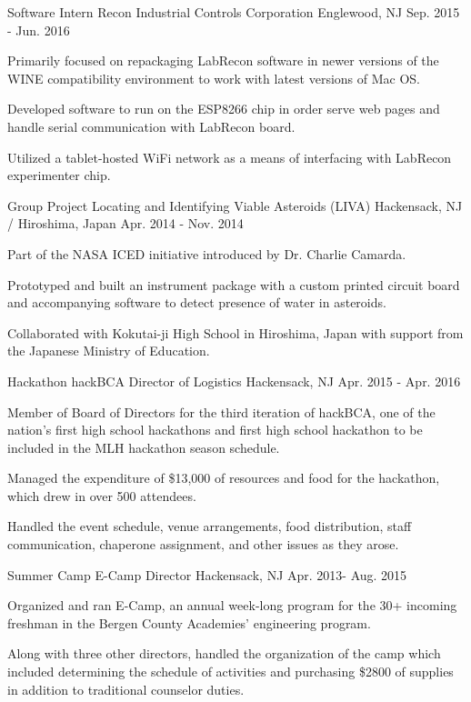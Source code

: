 \begin{cventries}
  \cventry
    {Software Intern}
    {Recon Industrial Controls Corporation}
    {Englewood, NJ}
    {Sep. 2015 - Jun. 2016}
    {
      \begin{cvitems}
        \item {Primarily focused on repackaging LabRecon software in newer versions of the
WINE compatibility environment to work with latest versions of Mac OS.}
        \item {Developed software to run on the ESP8266 chip in order serve web pages and
handle serial communication with LabRecon board.}
        \item {Utilized a tablet-hosted WiFi network as a means of interfacing with LabRecon
experimenter chip.}
      \end{cvitems}
    }
  \cventry
    {Group Project}
    {Locating and Identifying Viable Asteroids (LIVA)}
    {Hackensack, NJ / Hiroshima, Japan}
    {Apr. 2014 - Nov. 2014}
    {
      \begin{cvitems}
        \item {Part of the NASA ICED initiative introduced by Dr. Charlie Camarda.}
        \item {Prototyped and built an instrument package with a custom printed circuit board and accompanying
software to detect presence of water in asteroids.}
        \item {Collaborated with Kokutai-ji High School in Hiroshima, Japan with support from the
Japanese Ministry of Education.}
      \end{cvitems}
    }
  \cventry
    {Hackathon}
    {hackBCA Director of Logistics}
    {Hackensack, NJ}
    {Apr. 2015 - Apr. 2016}
    {
      \begin{cvitems}
        \item {Member of Board of Directors for the third iteration of hackBCA, one of the nation's first high school hackathons and first high school hackathon to be included in the MLH hackathon season schedule.}
        \item {Managed the expenditure of \$13,000 of resources and food for the hackathon, which drew in over 500 attendees.}
        \item { Handled the event schedule, venue arrangements, food distribution, staff
communication, chaperone assignment, and other issues as they arose.}
      \end{cvitems}
    }
  \cventry
    {Summer Camp}
    {E-Camp Director}
    {Hackensack, NJ}
    {Apr. 2013- Aug. 2015}
    {
      \begin{cvitems}
        \item {Organized and ran E-Camp, an annual week-long program for the 30+ incoming freshman in
the Bergen County Academies' engineering program.}
        \item {Along with three other directors, handled the organization of the camp which
included determining the schedule of activities and purchasing \$2800 of supplies in addition to
traditional counselor duties.}
      \end{cvitems}
    }
  

\end{cventries}
